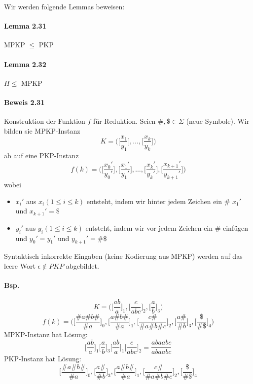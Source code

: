\para{} Wir werden folgende Lemmas beweisen:

\paragraph*{Lemma 2.31} MPKP $\leq$ PKP

\paragraph*{Lemma 2.32} $H \leq$ MPKP

\paragraph*{Beweis 2.31} Konstruktion der Funktion $f$ für Reduktion. Seien $\#,\$ \in \Sigma$ (neue Symbole). Wir bilden sie MPKP-Instanz $$ K=\Bigg( \Bigg[ \frac{x_1}{y_1} \Bigg], \dots, \Bigg[ \frac{x_k}{y_k} \Bigg]\Bigg) $$ ab auf eine PKP-Instanz $$ f(k)=\Bigg( \Bigg[ \frac{x_0'}{y_0'} \Bigg], \Bigg[ \frac{x_1'}{y_1'} \Bigg], \dots, \Bigg[ \frac{x_k'}{y_k'} \Bigg], \Bigg[ \frac{x_{k+1}'}{y_{k+1}'} \Bigg] \Bigg) $$ wobei
\begin{itemize}
	\item $x_i'$ aus $x_i (1 \leq i \leq k)$ entsteht, indem wir hinter jedem Zeichen ein \# $x_1'$ und $x_{k+1}'=\$$
	\item $y_i'$ aus $y_i (1 \leq i \leq k)$ entsteht, indem wir vor jedem Zeichen ein \# einfügen und $y_0'=y_1'$ und $y_{k+1}'=\#\$$
\end{itemize}
Syntaktisch inkorrekte Eingaben (keine Kodierung aus MPKP) werden auf das leere Wort $\epsilon \not\in PKP$ abgebildet.

\paragraph*{Bsp.} $$K=\Bigg( \Bigg[ \frac{ab}{a} \Bigg]_1, \Bigg[ \frac{c}{abc} \Bigg]_2, \Bigg[ \frac{a}{b} \Bigg]_3 \Bigg)$$ $$ f(k)=\Bigg( \Bigg[ \frac{\#a\#b\#}{\#a} \Bigg]_0, \Bigg[ \frac{a\#b\#}{\#a} \Bigg]_1, \Bigg[ \frac{c\#}{\#a\#b\#c} \Bigg]_2, \Bigg[ \frac{a\#}{\#b} \Bigg]_3, \Bigg[ \frac{\$}{\#\$} \Bigg]_4 \Bigg) $$
MPKP-Instanz hat Lösung:
$$ \Bigg[ \frac{ab}{a} \Bigg]_1 \Bigg[ \frac{a}{b} \Bigg]_3 \Bigg[ \frac{ab}{a} \Bigg]_1 \Bigg[ \frac{c}{abc} \Bigg]_2 = \frac{abaabc}{abaabc} $$
PKP-Instanz hat Lösung:
$$ \Bigg[\frac{\#a\#b\#}{\#a}  \Bigg]_0, \Bigg[\frac{a\#}{\#b}  \Bigg]_3, \Bigg[\frac{a\#b\#}{\#a}  \Bigg]_1, \Bigg[\frac{c\#}{\#a\#b\#c}  \Bigg]_2, \Bigg[\frac{\$}{\#\$}  \Bigg]_4 $$

